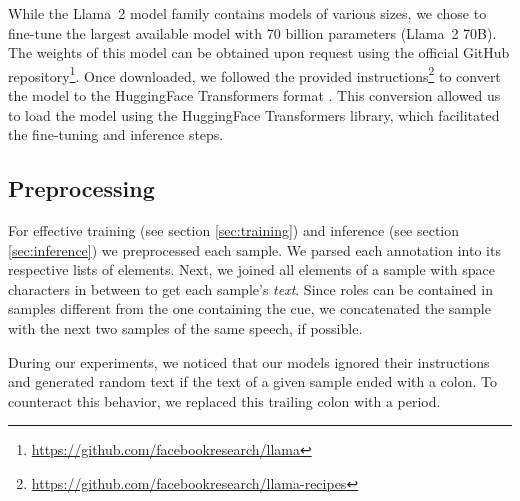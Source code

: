 \documentclass[11pt,a4paper]{article}
\begin{document}
While the Llama~2 model family contains models of various sizes, we chose to fine-tune the largest available model with 70 billion parameters (Llama~2 70B).
The weights of this model can be obtained upon request using the official GitHub repository\footnote{\url{https://github.com/facebookresearch/llama}}.
Once downloaded, we followed the provided instructions\footnote{\url{https://github.com/facebookresearch/llama-recipes}} to convert the model to the HuggingFace Transformers format \cite{Wolf2020}.
This conversion allowed us to load the model using the HuggingFace Transformers library, which facilitated the fine-tuning and inference steps.
 
\subsection{Preprocessing}
\label{sec:preprocessing}

For effective training (see section \ref{sec:training}) and inference (see section \ref{sec:inference}) we preprocessed each sample.
We parsed each annotation into its respective lists of elements.
Next, we joined all elements of a sample with space characters in between to get each sample's \emph{text}.
Since roles can be contained in samples different from the one containing the cue, we concatenated the sample with the next two samples of the same speech, if possible.

During our experiments, we noticed that our models ignored their instructions and generated random text if the text of a given sample ended with a colon.
To counteract this behavior, we replaced this trailing colon with a period.
\end{document}
